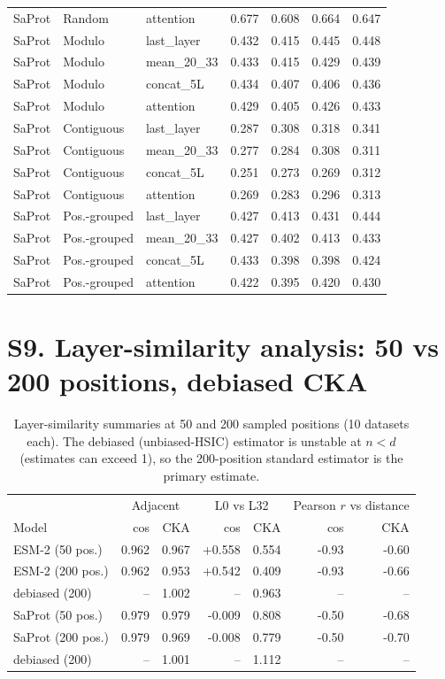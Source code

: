 \documentclass[11pt,a4paper]{article}
\begin{document}
\begin{table}[H]
\begin{tabular}{lllrrrr}
SaProt & Random & attention & 0.677 & 0.608 & 0.664 & 0.647 \\
SaProt & Modulo & last\_layer & 0.432 & 0.415 & 0.445 & 0.448 \\
SaProt & Modulo & mean\_20\_33 & 0.433 & 0.415 & 0.429 & 0.439 \\
SaProt & Modulo & concat\_5L & 0.434 & 0.407 & 0.406 & 0.436 \\
SaProt & Modulo & attention & 0.429 & 0.405 & 0.426 & 0.433 \\
SaProt & Contiguous & last\_layer & 0.287 & 0.308 & 0.318 & 0.341 \\
SaProt & Contiguous & mean\_20\_33 & 0.277 & 0.284 & 0.308 & 0.311 \\
SaProt & Contiguous & concat\_5L & 0.251 & 0.273 & 0.269 & 0.312 \\
SaProt & Contiguous & attention & 0.269 & 0.283 & 0.296 & 0.313 \\
SaProt & Pos.-grouped & last\_layer & 0.427 & 0.413 & 0.431 & 0.444 \\
SaProt & Pos.-grouped & mean\_20\_33 & 0.427 & 0.402 & 0.413 & 0.433 \\
SaProt & Pos.-grouped & concat\_5L & 0.433 & 0.398 & 0.398 & 0.424 \\
SaProt & Pos.-grouped & attention & 0.422 & 0.395 & 0.420 & 0.430 \\
\bottomrule
\end{tabular}
\end{table}

\section*{S9. Layer-similarity analysis: 50 vs 200 positions, debiased CKA}

\begin{table}[H]\centering\small
\caption{Layer-similarity summaries at 50 and 200 sampled positions (10 datasets each). The debiased (unbiased-HSIC) estimator is unstable at $n<d$ (estimates can exceed 1), so the 200-position standard estimator is the primary estimate.}
\label{tab:S9cka}
\begin{tabular}{lrrrrrr}
\toprule
& \multicolumn{2}{c}{Adjacent} & \multicolumn{2}{c}{L0 vs L32} & \multicolumn{2}{c}{Pearson $r$ vs distance} \\
Model & cos & CKA & cos & CKA & cos & CKA \\
\midrule
ESM-2 (50 pos.) & 0.962 & 0.967 & +0.558 & 0.554 & -0.93 & -0.60 \\
ESM-2 (200 pos.) & 0.962 & 0.953 & +0.542 & 0.409 & -0.93 & -0.66 \\
\quad debiased (200) & -- & 1.002 & -- & 0.963 & -- & -- \\
\midrule
SaProt (50 pos.) & 0.979 & 0.979 & -0.009 & 0.808 & -0.50 & -0.68 \\
SaProt (200 pos.) & 0.979 & 0.969 & -0.008 & 0.779 & -0.50 & -0.70 \\
\quad debiased (200) & -- & 1.001 & -- & 1.112 & -- & -- \\
\bottomrule
\end{tabular}
\end{table}
\end{document}
